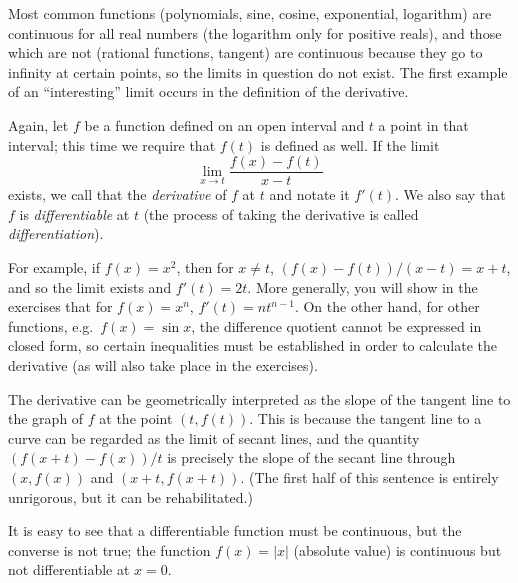 \documentclass[12pt]{report}
\numberwithin{exc}{section}
\begin{document}
Most common functions (polynomials, sine, 
cosine, exponential, logarithm) are continuous for all real numbers 
(the logarithm only for positive reals), and those which are not 
(rational functions, tangent) are continuous because they go to 
infinity at certain points, so the limits in question do not exist. 
The first example of an ``interesting'' limit occurs in the 
definition of the derivative.

Again, let $f$ be a function defined on an open interval and $t$ a 
point in that interval; this time we require that $f(t)$ is defined 
as well. If the limit
\[
\lim_{x \to t} \frac{f(x)-f(t)}{x-t}
\]
exists, we call that the \emph{derivative} of $f$ at $t$ and notate 
it $f'(t)$. We also say that $f$ is \emph{differentiable} at $t$ (the 
process of taking the derivative is called \emph{differentiation}).

For example, if $f(x) = x^2$, then for $x \neq t$, $(f(x)-f(t))/(x-t)
= x+t$, and so the limit exists and $f'(t) = 2t$. More generally,
you will show in the exercises that for $f(x) = x^n$, $f'(t) = nt^{n-1}$.
On the other hand, for other functions, e.g.\ $f(x) = \sin x$, the difference
quotient cannot be expressed in closed form, so certain inequalities must
be established in order to calculate the derivative (as will also take place
in the exercises).

The derivative can be geometrically interpreted as the slope of the 
tangent line to the graph of $f$ at the point $(t, f(t))$. This is 
because the tangent line to a curve can be regarded as the limit of secant 
lines, and the quantity $(f(x+t)-f(x))/t$ is precisely the slope of 
the secant line through $(x,f(x))$ and $(x+t, f(x+t))$. (The first 
half of this sentence is entirely unrigorous, but it can be 
rehabilitated.)

It is easy to see that a differentiable function must be continuous, 
but the converse is not true; the function $f(x) = |x|$ (absolute 
value) is continuous but not differentiable at $x=0$.
\end{document}
